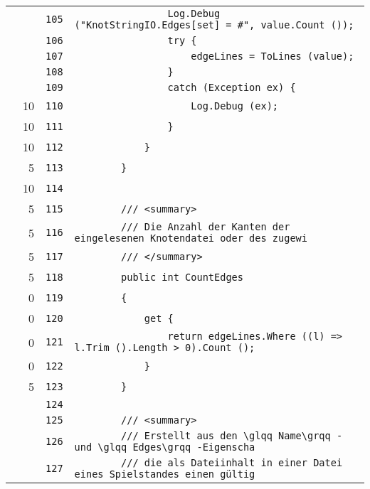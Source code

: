 \documentclass[a4paper,10pt]{article}
\begin{document}
\begin{longtable}[l]{lrrl}
\cellcolor{gray} &  & \verb~105~ & \verb~                Log.Debug ("KnotStringIO.Edges[set] = #", value.Count ());~\\
\cellcolor{gray} &  & \verb~106~ & \verb~                try {~\\
\cellcolor{gray} &  & \verb~107~ & \verb~                    edgeLines = ToLines (value);~\\
\cellcolor{gray} &  & \verb~108~ & \verb~                }~\\
\cellcolor{gray} &  & \verb~109~ & \verb~                catch (Exception ex) {~\\
\cellcolor{green} & 10 & \verb~110~ & \verb~                    Log.Debug (ex);~\\
\cellcolor{green} & 10 & \verb~111~ & \verb~                }~\\
\cellcolor{green} & 10 & \verb~112~ & \verb~            }~\\
\cellcolor{green} & 5 & \verb~113~ & \verb~        }~\\
\cellcolor{green} & 10 & \verb~114~ & \verb~~\\
\cellcolor{green} & 5 & \verb~115~ & \verb~        /// <summary>~\\
\cellcolor{green} & 5 & \verb~116~ & \verb~        /// Die Anzahl der Kanten der eingelesenen Knotendatei oder des zugewi~\\
\cellcolor{green} & 5 & \verb~117~ & \verb~        /// </summary>~\\
\cellcolor{green} & 5 & \verb~118~ & \verb~        public int CountEdges~\\
\cellcolor{red} & 0 & \verb~119~ & \verb~        {~\\
\cellcolor{red} & 0 & \verb~120~ & \verb~            get {~\\
\cellcolor{red} & 0 & \verb~121~ & \verb~                return edgeLines.Where ((l) => l.Trim ().Length > 0).Count ();~\\
\cellcolor{red} & 0 & \verb~122~ & \verb~            }~\\
\cellcolor{green} & 5 & \verb~123~ & \verb~        }~\\
\cellcolor{gray} &  & \verb~124~ & \verb~~\\
\cellcolor{gray} &  & \verb~125~ & \verb~        /// <summary>~\\
\cellcolor{gray} &  & \verb~126~ & \verb~        /// Erstellt aus den \glqq Name\grqq - und \glqq Edges\grqq -Eigenscha~\\
\cellcolor{gray} &  & \verb~127~ & \verb~        /// die als Dateiinhalt in einer Datei eines Spielstandes einen gültig~\\

\end{longtable}
\end{document}
